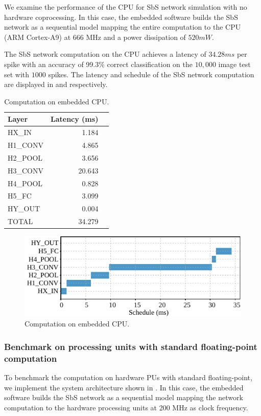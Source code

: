 We examine the performance of the CPU for SbS network simulation with no hardware coprocessing. In this case, the embedded software builds the SbS network as a sequential model mapping the entire computation to the CPU (ARM Cortex-A9) at 666 MHz and a power dissipation of $520 mW$.

The SbS network computation on the CPU achieves a latency of $34.28 ms$ per spike with an accuracy of 99.3\% correct classification on the $10,000$ image test set with $1000$ spikes. The latency and schedule of the SbS network computation are displayed in  and  respectively.

\begin{table}[!t]\centering
	\caption{Computation on embedded CPU.}\label{tab:latency_sw}
	\scriptsize
\begin{tabular}{lrr}\toprule
	\textbf{Layer} &\textbf{Latency (ms)} \\\midrule
	HX\_IN &1.184 \\
	H1\_CONV &4.865 \\
	H2\_POOL &3.656 \\
	H3\_CONV &20.643 \\
	H4\_POOL &0.828 \\
	H5\_FC &3.099 \\
	HY\_OUT &0.004 \\
		
	TOTAL &34.279 \\
	\bottomrule
\end{tabular}
\end{table}

\begin{figure}[t!]
	\centering
	\includegraphics[width=1\columnwidth]{../figures/latency_sw.pdf}
	\caption{Computation on embedded CPU.}
	\label{fig:latency_sw}
\end{figure}

\subsubsection{Benchmark on processing units with standard floating-point computation}
To benchmark the computation on hardware PUs with standard floating-point, we implement the system architecture shown in . In this case, the embedded software builds the SbS network as a sequential model mapping the network computation to the hardware processing units at 200 MHz as clock frequency.

